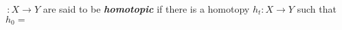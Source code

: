 \documentclass[preview]{standalone}
\begin{document}
\begin{center}
$\,: X\to Y$ are said to be \textbf{\textit{homotopic}} if there is a homotopy $h_t : X\to Y$ such that $h_0=$
\end{center}
\end{document}
